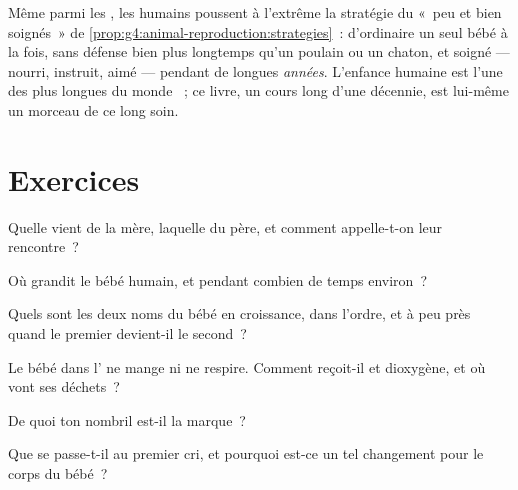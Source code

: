 \begin{example}\label{ex:g5:human-reproduction:longcare}
Même parmi les , les humains poussent à l'extrême la
stratégie du «~peu et bien soignés~» de
\cref{prop:g4:animal-reproduction:strategies}~: d'ordinaire un seul
bébé à la fois, sans défense bien plus longtemps qu'un poulain ou un
chaton, et soigné --- nourri, instruit, aimé --- pendant de longues
\emph{années}. L'enfance humaine est l'une des plus longues du monde
~; ce livre, un cours long d'une décennie, est lui-même un
morceau de ce long soin.
\end{example}

\section{Exercices}

\begin{exercise}[$\star$]\label{exo:g5:human-reproduction:1}
Quelle  vient de la mère, laquelle du père, et comment
appelle-t-on leur rencontre~?
\end{exercise}

\begin{exercise}[$\star$]\label{exo:g5:human-reproduction:2}
Où grandit le bébé humain, et pendant combien de temps environ~?
\end{exercise}

\begin{exercise}[$\star$]\label{exo:g5:human-reproduction:3}
Quels sont les deux noms du bébé en croissance, dans l'ordre, et à
peu près quand le premier devient-il le second~?
\end{exercise}

\begin{exercise}[$\star$]\label{exo:g5:human-reproduction:4}
Le bébé dans l' ne mange ni ne respire. Comment reçoit-il
 et dioxygène, et où vont ses déchets~?
\end{exercise}

\begin{exercise}[$\star$]\label{exo:g5:human-reproduction:5}
De quoi ton nombril est-il la marque~?
\end{exercise}

\begin{exercise}[$\star$]\label{exo:g5:human-reproduction:6}
Que se passe-t-il au premier cri, et pourquoi est-ce un tel
changement pour le corps du bébé~?
\end{exercise}

